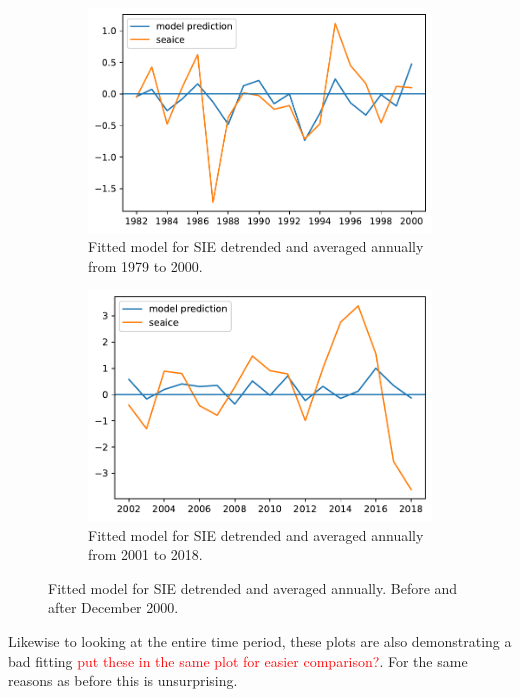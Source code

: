\begin{figure}[H]
    \begin{subfigure}{\linewidth}
    \centering
    \includegraphics{Images_3.0/regressions/multivariate_model_anomalous_n1_annually_detrended_1979_2000.pdf}
    \caption{Fitted model for SIE detrended and averaged annually from 1979 to 2000.}
    \label{fig:multivariate_model_anomalous_n1_annually_detrended_1979_2000}
    \end{subfigure}
    
    \begin{subfigure}{\linewidth}
    \centering
    \includegraphics{Images_3.0/regressions/multivariate_model_anomalous_n1_annually_detrended_2001_2018.pdf}
    \caption{Fitted model for SIE detrended and averaged annually from 2001 to 2018.}
    \label{fig:multivariate_model_anomalous_n1_annually_detrended_2001_2018}
    \end{subfigure}
    \caption{Fitted model for SIE detrended and averaged annually. Before and after December 2000.}
\end{figure}

Likewise to looking at the entire time period, these plots are also demonstrating a bad fitting \textcolor{red}{put these in the same plot for easier comparison?}. For the same reasons as before this is unsurprising.
